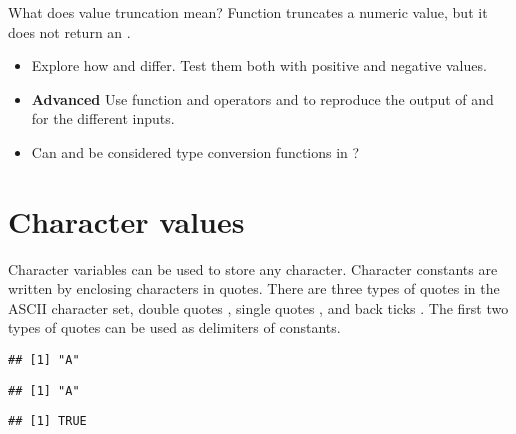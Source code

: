 \documentclass[krantz2]{krantz}\usepackage{knitr}
\begin{document}
\begin{playground}
What does value truncation mean? Function  truncates a numeric value, but it does not return an .
\begin{itemize}
  \item Explore how  and  differ. Test them both with positive and negative values.
  \item \textbf{Advanced} Use function  and operators \Roperator{+} and \Roperator{-} to reproduce the output of  and  for the different inputs.
  \item Can  and  be considered type conversion functions in \Rlang?
\end{itemize}
\end{playground}


\section{Character values}\label{sec:calc:character}
Character variables can be used to store any character. Character constants are written by enclosing characters in quotes. There are three types of quotes in the ASCII character set, double quotes , single quotes , and back ticks . The first two types of quotes can be used as delimiters of  constants.

\begin{knitrout}\footnotesize
{}\color{fgcolor}\begin{kframe}
\begin{alltt}
 \hlkwb{<-} 
\end{alltt}
\begin{verbatim}
## [1] "A"
\end{verbatim}
\begin{alltt}
 \hlkwb{<-} 
\end{alltt}
\begin{verbatim}
## [1] "A"
\end{verbatim}
\begin{alltt}
 \hlopt{==} 
\end{alltt}
\begin{verbatim}
## [1] TRUE
\end{verbatim}
\end{kframe}
\end{knitrout}
\end{document}
